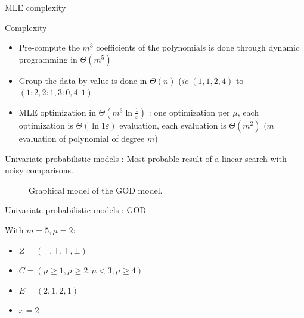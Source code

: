 \documentclass{beamer}
\renewcommand{\epsilon}{\varepsilon}
\renewcommand{\geq}{\geqslant}
\begin{document}
\begin{frame}{MLE complexity}

\begin{block}{Complexity}
    \begin{itemize}
        \item Pre-compute the $m^3$ coefficients of the polynomials is done through dynamic programming in $\Theta(m^5)$
        \item Group the data by value is done in $\Theta(n)$ (\textit{ie} $(1, 1, 2, 4)$ to $(1:2, 2:1, 3:0, 4:1)$
        \item MLE optimization in $\Theta(m^3 \ln\frac{1}{\epsilon})$ : one optimization per $\mu$, each optimization is $\Theta(\ln{1}{\epsilon})$ evaluation, each evaluation is $\Theta(m^2)$ ($m$ evaluation of polynomial of degree $m$)
    \end{itemize}
\end{block}

\end{frame}

\begin{frame}{Univariate probabilistic models}
        : Most probable result of a linear search with noisy comparisons.
        
        \begin{figure}[htbp]
        \centering
        \caption*{Graphical model of the GOD model.}
        \label{fig:god_graphical_model}
    \end{figure}
\end{frame}


\begin{frame}{Univariate probabilistic models : GOD}

    \begin{example}
        With $m = 5, \mu = 2$:
        \begin{itemize}
            \item $Z = (\top, \top, \top, \bot)$

            \item $C = (\mu \geq 1, \mu \geq 2, \mu < 3, \mu \geq 4)$

            \item $E = (2, 1, 2, 1)$

            \item $x = 2$
        \end{itemize}
    \end{example}
\end{frame}
\end{document}
